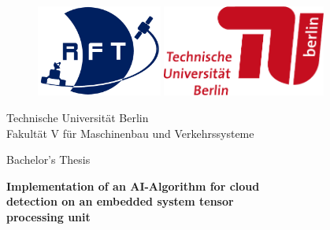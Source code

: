 
\begin{titlepage}
\thispagestyle{empty} %

\rmfamily

\vspace*{-1.5cm}

\begin{figure}[ht]
\centering
\begin{minipage}{0.45\textwidth}
    \centering
    \includegraphics[height=30mm]{files/RFT_Logo}
\end{minipage}%
\hfill
\begin{minipage}{0.45\textwidth}
    \centering
    \includegraphics[height=30mm]{files/TU_Logo_lang_RGB_rot}
\end{minipage}
\end{figure}

\vspace{2.5cm}

\begin{center}
    Technische Universität Berlin\\
    Fakultät V für Maschinenbau und Verkehrssysteme

    \vspace{2cm}

    Bachelor's Thesis

    \vspace{1.5cm}

    \begin{spacing}{1.3}
    \textbf{\LARGE
        Implementation of an AI-Algorithm for cloud\\
        detection on an embedded system tensor\\
        processing unit\\}
    \end{spacing}


\end{center}
\end{titlepage}
